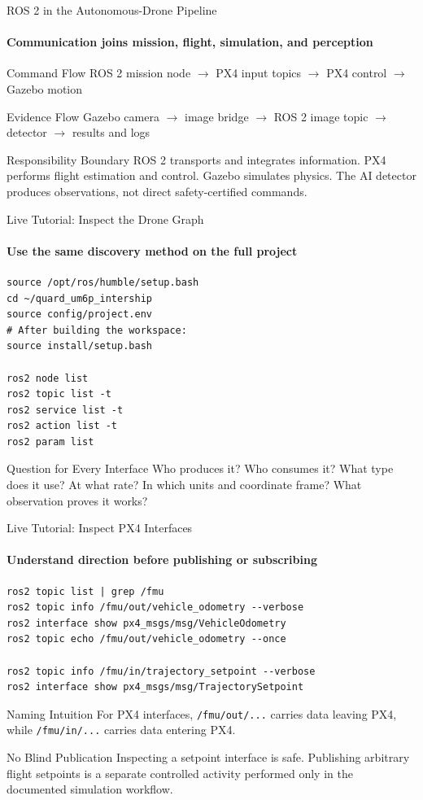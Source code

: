 \begin{frame}{ROS 2 in the Autonomous-Drone Pipeline}
\framesubtitle{Communication joins mission, flight, simulation, and perception}
\footnotesize
\begin{block}{Command Flow}
\centering
ROS 2 mission node $\rightarrow$ PX4 input topics $\rightarrow$ PX4 control $\rightarrow$ Gazebo motion
\end{block}
\begin{exampleblock}{Evidence Flow}
\centering
Gazebo camera $\rightarrow$ image bridge $\rightarrow$ ROS 2 image topic $\rightarrow$ detector $\rightarrow$ results and logs
\end{exampleblock}
\begin{alertblock}{Responsibility Boundary}
ROS 2 transports and integrates information. PX4 performs flight estimation and control. Gazebo simulates physics. The AI detector produces observations, not direct safety-certified commands.
\end{alertblock}
\end{frame}

\begin{frame}[fragile]{Live Tutorial: Inspect the Drone Graph}
\framesubtitle{Use the same discovery method on the full project}
\scriptsize
\begin{verbatim}
source /opt/ros/humble/setup.bash
cd ~/quard_um6p_intership
source config/project.env
# After building the workspace:
source install/setup.bash

ros2 node list
ros2 topic list -t
ros2 service list -t
ros2 action list -t
ros2 param list
\end{verbatim}
\begin{exampleblock}{Question for Every Interface}
Who produces it? Who consumes it? What type does it use? At what rate? In which units and coordinate frame? What observation proves it works?
\end{exampleblock}
\end{frame}

\begin{frame}[fragile]{Live Tutorial: Inspect PX4 Interfaces}
\framesubtitle{Understand direction before publishing or subscribing}
\scriptsize
\begin{verbatim}
ros2 topic list | grep /fmu
ros2 topic info /fmu/out/vehicle_odometry --verbose
ros2 interface show px4_msgs/msg/VehicleOdometry
ros2 topic echo /fmu/out/vehicle_odometry --once

ros2 topic info /fmu/in/trajectory_setpoint --verbose
ros2 interface show px4_msgs/msg/TrajectorySetpoint
\end{verbatim}
\begin{block}{Naming Intuition}
For PX4 interfaces, \texttt{/fmu/out/...} carries data leaving PX4, while \texttt{/fmu/in/...} carries data entering PX4.
\end{block}
\begin{alertblock}{No Blind Publication}
Inspecting a setpoint interface is safe. Publishing arbitrary flight setpoints is a separate controlled activity performed only in the documented simulation workflow.
\end{alertblock}
\end{frame}

